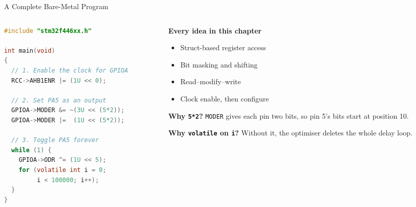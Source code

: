\documentclass[9pt,aspectratio=169,xcolor=table]{beamer}
\begin{document}
\begin{frame}[fragile]{A Complete Bare-Metal Program}
    \begin{columns}[T]
    \begin{column}{.56\textwidth}
\begin{lstlisting}[language=C, basicstyle=\ttfamily\footnotesize]
#include "stm32f446xx.h"

int main(void)
{
  // 1. Enable the clock for GPIOA
  RCC->AHB1ENR |= (1U << 0);

  // 2. Set PA5 as an output
  GPIOA->MODER &= ~(3U << (5*2));
  GPIOA->MODER |=  (1U << (5*2));

  // 3. Toggle PA5 forever
  while (1) {
    GPIOA->ODR ^= (1U << 5);
    for (volatile int i = 0;
         i < 100000; i++);
  }
}
\end{lstlisting}
    \end{column}
    \begin{column}{.4\textwidth}
        \textbf{Every idea in this chapter}
        {\small
        \begin{itemize}\itemsep1pt
            \item Struct-based register access
            \item Bit masking and shifting
            \item Read--modify--write
            \item Clock enable, then configure
        \end{itemize}}

        \vspace{2mm}
        {\small \textbf{Why \texttt{5*2}?} \texttt{MODER} gives each
        pin \alert{two} bits, so pin 5's bits start at position 10.}

        \vspace{2mm}
        {\small \textbf{Why \texttt{volatile} on \texttt{i}?} Without
        it, the optimiser deletes the whole delay loop.}
    \end{column}
    \end{columns}
\end{frame}
\end{document}
